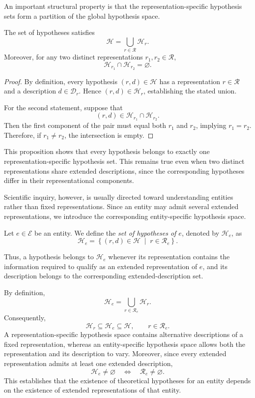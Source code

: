 An important structural property is that the representation-specific hypothesis sets form a partition of the global hypothesis space.

\begin{proposition}
\label{prop:hypothesis_rep_partition}
The set of hypotheses satisfies
\[
\mathcal{H} = \bigcup_{r\in\mathcal{R}}\mathcal{H}_r.
\]
Moreover, for any two distinct representations $r_1,r_2\in\mathcal{R}$,
\[
\mathcal{H}_{r_1}\cap\mathcal{H}_{r_2} = \varnothing.
\]
\end{proposition}

\begin{proof}
By definition, every hypothesis $(r,d)\in\mathcal{H}$ has a representation $r\in\mathcal{R}$ and a description $d\in\mathcal{D}_r$. Hence $(r,d)\in\mathcal{H}_r$, establishing the stated union.

For the second statement, suppose that
\[
(r,d)\in\mathcal{H}_{r_1}\cap\mathcal{H}_{r_2}.
\]
Then the first component of the pair must equal both $r_1$ and $r_2$, implying $r_1=r_2$. Therefore, if $r_1\neq r_2$, the intersection is empty.
\end{proof}

This proposition shows that every hypothesis belongs to exactly one representation-specific hypothesis set. This remains true even when two distinct representations share extended descriptions, since the corresponding hypotheses differ in their representational components.

Scientific inquiry, however, is usually directed toward understanding entities rather than fixed representations. Since an entity may admit several extended representations, we introduce the corresponding entity-specific hypothesis space.

\begin{definition}
\label{def:hypotheses_for_entity}
Let $e\in\mathcal{E}$ be an entity. We define the \emph{set of hypotheses of $e$}, denoted by $\mathcal{H}_e$, as
\[
\mathcal{H}_e = \left\{(r,d)\in\mathcal{H} \;\middle|\; r\in\mathcal{R}_e \right\}.
\]
\end{definition}

Thus, a hypothesis belongs to $\mathcal{H}_e$ whenever its representation contains the information required to qualify as an extended representation of $e$, and its description belongs to the corresponding extended-description set.

By definition,
\[
\mathcal{H}_e = \bigcup_{r\in\mathcal{R}_e}\mathcal{H}_r.
\]
Consequently,
\[
\mathcal{H}_r \subseteq \mathcal{H}_e \subseteq \mathcal{H}, \qquad r\in\mathcal{R}_e.
\]
A representation-specific hypothesis space contains alternative descriptions of a fixed representation, whereas an entity-specific hypothesis space allows both the representation and its description to vary. Moreover, since every extended representation admits at least one extended description,
\[
\mathcal{H}_e\neq\varnothing \quad\Longleftrightarrow\quad \mathcal{R}_e\neq\varnothing.
\]
This establishes that the existence of theoretical hypotheses for an entity depends on the existence of extended representations of that entity.

